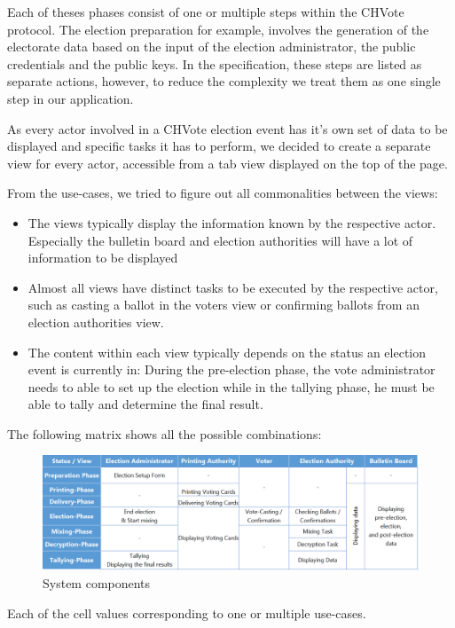 Each of theses phases consist of one or multiple steps within the CHVote protocol. The election preparation for example, involves the generation of the electorate data based on the input of the election administrator, the public credentials and the public keys. In the specification, these steps are listed as separate actions, however, to reduce the complexity we treat them as one single step in our application. 

As every actor involved in a CHVote election event has it's own set of data to be displayed and specific tasks it has to perform, we decided to create a separate view for every actor, accessible from a tab view displayed on the top of the page.

From the use-cases, we tried to figure out all commonalities between the views:

\begin{itemize}
	\item The views typically display the information known by the respective actor. Especially the bulletin board and election authorities will have a lot of information to be displayed
	\item Almost all views have distinct tasks to be executed by the respective actor, such as casting a ballot in the voters view or confirming ballots from an election authorities view.
  \item The content within each view typically depends on the status an election event is currently in: During the pre-election phase, the vote administrator needs to able to set up the election while in the tallying phase, he must be able to tally and determine the final result.
\end{itemize}
The following matrix shows all the possible combinations:
\begin{figure}[h!]
\begin{center}
\includegraphics[scale=0.95]{assets/stateactormatrix.png}
\caption{System components}
\end{center}
\end{figure}
Each of the cell values corresponding to one or multiple use-cases.

